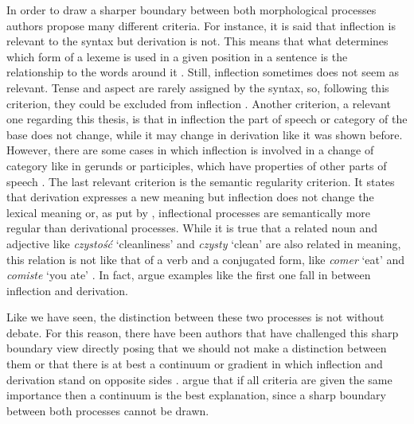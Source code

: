 \documentclass[12pt]{article}
\newcommand{\ita}[1]{\textit{#1}}
\begin{document}
In order to draw a sharper boundary between both morphological processes authors propose many different criteria. 
For instance, it is said that inflection is relevant to the syntax but derivation is not. This means that what determines which form of a lexeme is used in a given position in a sentence is the relationship to the words around it \parencite{booij2012GrammarWordsIntroduction,aronoff2011WhatMorphology}. Still, inflection sometimes does not seem as relevant. Tense and aspect are rarely assigned by the syntax, so, following this criterion, they could be excluded from inflection \parencite{haspelmath2013UnderstandingMorphology}.
Another criterion, a relevant one regarding this thesis, is that in inflection the part of speech or category of the base does not change, while it may change in derivation \parencite{haspelmath2013UnderstandingMorphology} like it was shown before. However, there are some cases in which inflection is involved in a change of category like in gerunds or participles, which have properties of other parts of speech \parencite{booij2012GrammarWordsIntroduction}. 
The last relevant criterion is the semantic regularity criterion. It states that derivation expresses a new meaning but inflection does not change the lexical meaning \parencite{haspelmath2013UnderstandingMorphology} or, as put by \textcite{stump2017Inflection}, inflectional processes are semantically more regular than derivational processes. While it is true that a related noun and adjective like \ita{czystość} `cleanliness' and \ita{czysty} `clean' are also related in meaning, this relation is not like that of a verb and a conjugated form, like \ita{comer} `eat' and \ita{comiste} `you ate' \parencite{aronoff2011WhatMorphology}. In fact, \textcite{haspelmath2013UnderstandingMorphology} argue examples like the first one fall in between inflection and derivation.

Like we have seen, the distinction between these two processes is not without debate. For this reason, there have been authors that have challenged this sharp boundary view directly posing that we should not make a distinction between them \parencite{haspelmath2024InflectionDerivationTraditional} or that there is at best a continuum or gradient in which inflection and derivation stand on opposite sides \parencite{bybee1985MorphologyStudyRelation, stekauer2015DelimitationDerivationInflection}. \textcite{haspelmath2013UnderstandingMorphology} argue that if all criteria are given the same importance then a continuum is the best explanation, since a sharp boundary between both processes cannot be drawn. 
\end{document}
